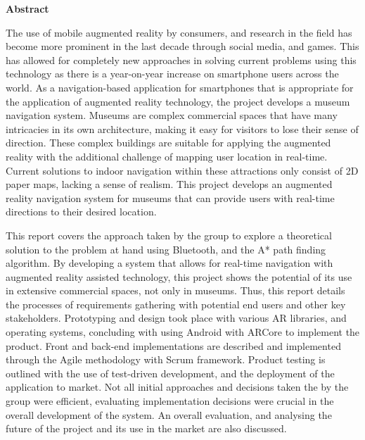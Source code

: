 \begin{center}        
    \Large
    \textbf{Abstract}\\
\end{center}

The use of mobile augmented reality by consumers, and research in the field has become more prominent in the last decade through social media, and games. This has allowed for completely new approaches in solving current problems using this technology as there is a year-on-year increase on smartphone users across the world. As a navigation-based application for smartphones that is appropriate for the application of augmented reality technology, the project develops a museum navigation system. Museums are complex commercial spaces that have many intricacies in its own architecture, making it easy for visitors to lose their sense of direction. These complex buildings are suitable for applying the augmented reality with the additional challenge of mapping user location in real-time. Current solutions to indoor navigation within these attractions only consist of 2D paper maps, lacking a sense of realism. This project develops an augmented reality navigation system for museums that can provide users with real-time directions to their desired location.

This report covers the approach taken by the group to explore a theoretical solution to the problem at hand using Bluetooth, and the A* path finding algorithm. By developing a system that allows for real-time navigation with augmented reality assisted technology, this project shows the potential of its use in extensive commercial spaces, not only in museums. Thus, this report details the processes of requirements gathering with potential end users and other key stakeholders. Prototyping and design took place with various AR libraries, and operating systems, concluding with using Android with ARCore to implement the product. Front and back-end implementations are described and implemented through the Agile methodology with Scrum framework. Product testing is outlined with the use of test-driven development, and the deployment of the application to market. Not all initial approaches and decisions taken the by the group were efficient, evaluating implementation decisions were crucial in the overall development of the system. An overall evaluation, and analysing the future of the project and its use in the market are also discussed.

\afterpage{\blankpage}
